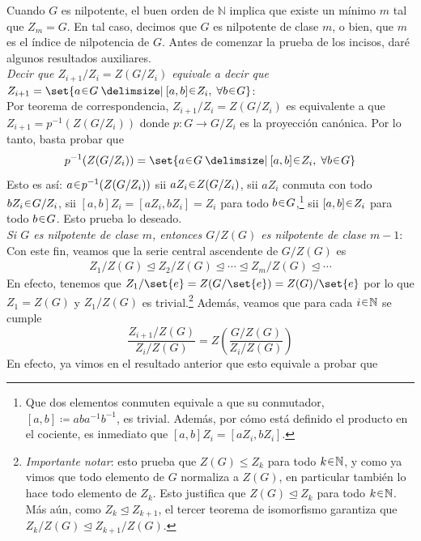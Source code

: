 \begin{sol}[Demostración]
Cuando $G$ es nilpotente, el buen orden de $\mathbb{N}$ implica que existe un mínimo $m$ tal que $Z_m = G$. En tal caso, decimos que $G$ es nilpotente de clase $m$, o bien, que $m$ es el índice de nilpotencia de $G$. Antes de comenzar la prueba de los incisos, daré algunos resultados auxiliares.\vspace{1em}\\
\emph{Decir que $Z_{i+1}/Z_i = Z(G/Z_i)$ equivale a decir que $Z_{i+1} = \set{a \en G \given [a,b] \en Z_i,\; \forall b \en G}$}:\\
Por teorema de correspondencia, $Z_{i+1}/Z_i = Z(G/Z_i)$ es equivalente a que $Z_{i+1} = p^{-1}(Z(G/Z_i))$ donde $p \colon G \to G/Z_i$ es la proyección canónica. Por lo tanto, basta probar que 
\[
p^{-1}(Z(G/Z_i)) =%
\set{a \en G \given [a,b] \en Z_i,\; \forall b \en G}
\]
Esto es así: $a \en p^{-1}(Z(G/Z_i))$ sii $aZ_i \en Z(G/Z_i)$, sii $aZ_i$ conmuta con todo $bZ_i \en G/Z_i$, sii $[a,b]Z_i =[aZ_i,bZ_i] = Z_i$ para todo $b \en G$,\footnote{Que dos elementos conmuten equivale a que su conmutador, $[a,b] \coloneq aba^{-1}b^{-1}$, es trivial. Además, por cómo está definido el producto en el cociente, es inmediato que $[a,b]Z_i = [aZ_i,bZ_i]$.} sii $[a,b] \en Z_i$ para todo $b \en G$. Esto prueba lo deseado.\vspace{1em}\\
\emph{Si $G$ es nilpotente de clase $m$, entonces $G/Z(G)$ es nilpotente de clase $m-1$}:\\
Con este fin, veamos que la serie central ascendente de $G/Z(G)$ es
\begin{gather}\label{serie:1}
Z_1/Z(G) \trianglelefteq Z_2/Z(G) \trianglelefteq \cdots \trianglelefteq Z_m/Z(G) \trianglelefteq \cdots
\end{gather}
En efecto, tenemos que $Z_1/\set{e} = Z(G/\set{e}) = Z(G)/\set{e}$ por lo que $Z_1 = Z(G)$ y $Z_1/Z(G)$ es trivial.\footnote{\emph{Importante notar}: esto prueba que $Z(G) \leq Z_k$ para todo $k \en \mathbb{N}$, y como ya vimos que todo elemento de $G$ normaliza a $Z(G)$, en particular también lo hace todo elemento de $Z_k$. Esto justifica que $Z(G) \trianglelefteq Z_k$ para todo $k \en \mathbb{N}$. Más aún, como $Z_k \trianglelefteq Z_{k+1}$, el tercer teorema de isomorfismo garantiza que $Z_k/Z(G) \trianglelefteq Z_{k+1}/Z(G)$.} Además, veamos que para cada $i \en \mathbb{N}$ se cumple
\[
\frac{Z_{i+1}/Z(G)}{Z_i/Z(G)} = Z\left( \frac{G/Z(G)}{Z_i/Z(G)} \right)
\]
En efecto, ya vimos en el resultado anterior que esto equivale a probar que

\end{sol}

